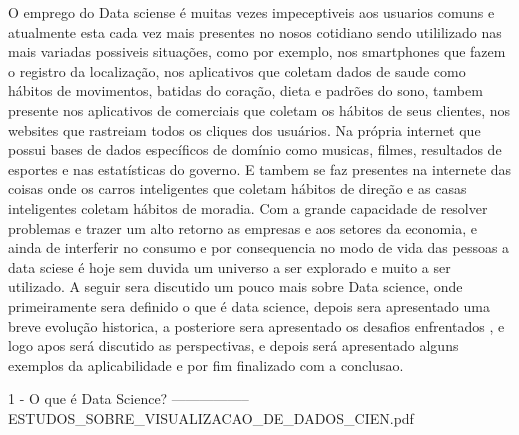   O emprego do Data sciense é  muitas vezes impeceptiveis aos usuarios comuns e atualmente esta cada vez mais presentes no nosos cotidiano sendo utililizado nas mais variadas possiveis situações, como por exemplo,  nos smartphones que fazem o registro da localização,  nos aplicativos que coletam dados de saude como hábitos de movimentos, batidas do coração, dieta e padrões do sono, tambem presente nos aplicativos de comerciais  que coletam os hábitos de seus clientes, nos websites que  rastreiam todos os cliques dos usuários. Na própria internet que possui  bases de dados específicos de domínio como musicas, filmes, resultados de esportes e nas estatísticas do governo. E tambem se faz presentes na internete das coisas onde os carros inteligentes que coletam hábitos de direção e as casas inteligentes coletam hábitos de moradia. 
Com a grande capacidade de resolver problemas e trazer um alto retorno as empresas e aos setores da economia, e ainda de interferir no consumo e por consequencia no modo de vida das pessoas a data sciese é hoje sem duvida um universo a ser explorado e muito a ser utilizado. A seguir sera discutido um pouco mais sobre Data science, onde primeiramente  sera definido o que é data science, depois sera apresentado uma breve evolução historica, a posteriore sera apresentado os desafios enfrentados , e logo apos será discutido as perspectivas, e depois será apresentado alguns exemplos da aplicabilidade e por fim finalizado com a conclusao.

1 - O que é Data Science?  ----------------- ESTUDOS_SOBRE_VISUALIZACAO_DE_DADOS_CIEN.pdf

